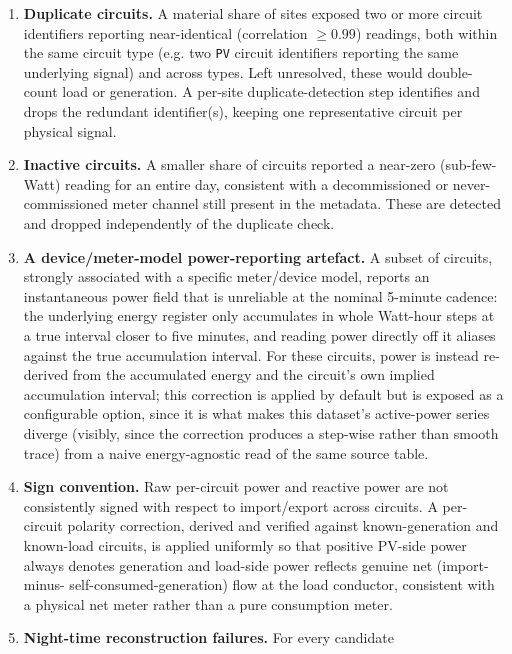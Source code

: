 \begin{enumerate}
  \item \textbf{Duplicate circuits.} A material share of sites exposed
    two or more circuit identifiers reporting near-identical (correlation
    $\geq 0.99$) readings, both within the same circuit type (e.g. two
    \texttt{PV} circuit identifiers reporting the same underlying signal)
    and across types. Left unresolved, these would double-count load or
    generation. A per-site duplicate-detection step identifies and drops
    the redundant identifier(s), keeping one representative circuit per
    physical signal.
  \item \textbf{Inactive circuits.} A smaller share of circuits reported
    a near-zero (sub-few-Watt) reading for an entire day, consistent with
    a decommissioned or never-commissioned meter channel still present in
    the metadata. These are detected and dropped independently of the
    duplicate check.
  \item \textbf{A device/meter-model power-reporting artefact.} A subset
    of circuits, strongly associated with a specific meter/device model,
    reports an instantaneous power field that is unreliable at the
    nominal 5-minute cadence: the underlying energy register only
    accumulates in whole Watt-hour steps at a true interval closer to
    five minutes, and reading power directly off it aliases against the
    true accumulation interval. For these circuits, power is instead
    re-derived from the accumulated energy and the circuit's own implied
    accumulation interval; this correction is applied by default but is
    exposed as a configurable option, since it is what makes this
    dataset's active-power series diverge (visibly, since the correction
    produces a step-wise rather than smooth trace) from a naive
    energy-agnostic read of the same source table.
  \item \textbf{Sign convention.} Raw per-circuit power and reactive
    power are not consistently signed with respect to import/export
    across circuits. A per-circuit polarity correction, derived and
    verified against known-generation and known-load circuits, is
    applied uniformly so that positive PV-side power always denotes
    generation and load-side power reflects genuine net (import-minus-
    self-consumed-generation) flow at the load conductor, consistent
    with a physical net meter rather than a pure consumption meter.
  \item \textbf{Night-time reconstruction failures.} For every candidate

\end{enumerate}
